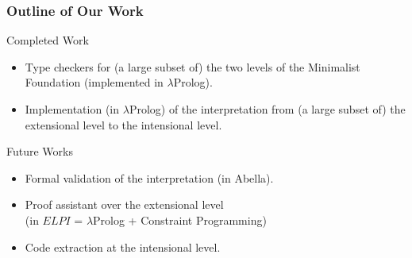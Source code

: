 \documentclass{beamer}
\begin{document}
%

\begin{frame}
\frametitle{Outline of Our Work}
\begin{block}{Completed Work}
	\begin{itemize}
	\item	Type checkers for (a large subset of) the two levels of the Minimalist Foundation 
			(implemented in $\lambda$Prolog).
	\item 	Implementation (in $\lambda$Prolog) of the interpretation from 
			(a large subset of) the extensional level to the intensional level.
	\end{itemize}
\end{block}
\begin{block}{Future Works}
	\begin{itemize}
                \item   Formal validation of the interpretation (in Abella).
		\item	Proof assistant over the extensional level\\
                 (in $ELPI$ = $\lambda$Prolog + Constraint Programming)
		\item 	Code extraction at the intensional level.
	\end{itemize}
\end{block}

	\note[item]{ }



\end{frame}
\end{document}
